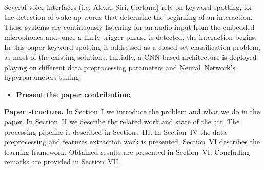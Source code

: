 \noindent  Several voice interfaces (i.e. Alexa, Siri, Cortana) rely on keyword spotting, for the detection of wake-up words that determine the beginning of an interaction. These systems are continuously listening for an audio input from the embedded microphones and, once a likely trigger phrase is detected, the interaction begins. 
In this paper keyword spotting is addressed as a closed-set classification problem, as most of the existing solutions. Initially, a CNN-based architecture is deployed playing on different data preprocessing parameters and \mbox{Neural Network's} hyperparameters tuning. 
\begin{itemize} 
\item \textbf{Present the paper contribution:} 
\end{itemize}
\noindent \textbf{Paper structure.} In Section~I we introduce the problem and what we do in the paper. In Section~II we describe the related work and state of the art. The processing pipeline is described in Sections~III. In Section~IV the data preprocessing and features extraction work is presented. Section~VI describes the learning framework. Obtained results are presented in Section~VI.  Concluding remarks are provided in Section~VII.

